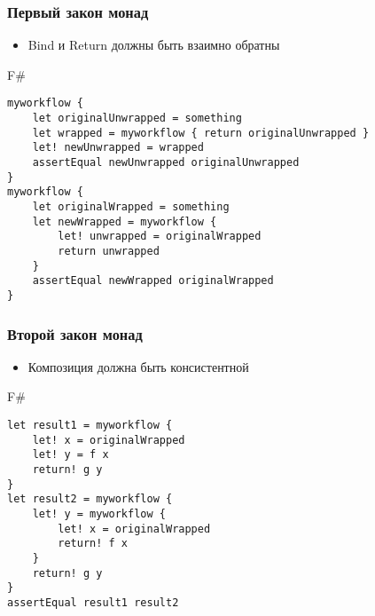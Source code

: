 \documentclass[xetex,mathserif,serif]{beamer}
\begin{document}
	\begin{frame}[fragile]
		\frametitle{Первый закон монад}
		\begin{itemize}
    		\item Bind и Return должны быть взаимно обратны
		\end{itemize}
   		\begin{exampleblock}{F\#}
   			\begin{lstlisting}
myworkflow {
    let originalUnwrapped = something
    let wrapped = myworkflow { return originalUnwrapped }
    let! newUnwrapped = wrapped
    assertEqual newUnwrapped originalUnwrapped 
}
myworkflow {
    let originalWrapped = something
    let newWrapped = myworkflow { 
        let! unwrapped = originalWrapped
        return unwrapped
    }
    assertEqual newWrapped originalWrapped
}
\end{lstlisting}
\end{exampleblock}
\end{frame}

	\begin{frame}[fragile]
		\frametitle{Второй закон монад}
		\begin{itemize}
    		\item Композиция должна быть консистентной
		\end{itemize}
   		\begin{exampleblock}{F\#}
   			\begin{lstlisting}
let result1 = myworkflow { 
    let! x = originalWrapped
    let! y = f x 
    return! g y  
}
let result2 = myworkflow { 
    let! y = myworkflow { 
        let! x = originalWrapped
        return! f x
    }
    return! g y
}
assertEqual result1 result2
\end{lstlisting}
\end{exampleblock}
\end{frame}
\end{document}
